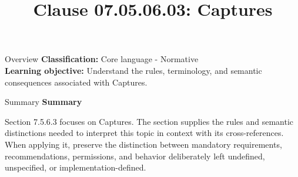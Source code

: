 \documentclass[10pt,letterpaper]{article}
\title{Clause 07.05.06.03: Captures}
\author{}
\date{}
\begin{document}
\maketitle
\begin{CornellOverviewBox}{Overview}
\textbf{Classification:} Core language - Normative\\[2pt]
\textbf{Learning objective:} Understand the rules, terminology, and semantic consequences associated with Captures.
\end{CornellOverviewBox}\begin{CornellSummaryBox}{Summary}
{\sffamily\bfseries\color{Accent} Summary}\par\vspace{3pt}Section 7.5.6.3 focuses on Captures. The section supplies the rules and semantic distinctions needed to interpret this topic in context with its cross-references. When applying it, preserve the distinction between mandatory requirements, recommendations, permissions, and behavior deliberately left undefined, unspecified, or implementation-defined.
\end{CornellSummaryBox}
\end{document}
